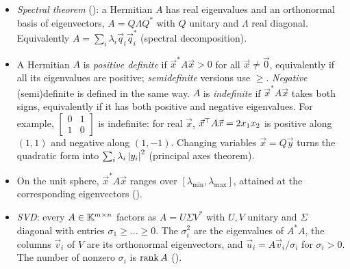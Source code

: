 \begin{itemize}
  \item \emph{Spectral theorem} (): a Hermitian $A$ has real eigenvalues and an orthonormal basis of eigenvectors, $A = Q\Lambda Q^\ast$ with $Q$ unitary and $\Lambda$ real diagonal. Equivalently $A = \sum_i \lambda_i\vec{q}_i\vec{q}_i^\ast$ (spectral decomposition).
  \item A Hermitian $A$ is \emph{positive definite} if $\vec{x}^\ast A\vec{x} > 0$ for all $\vec{x} \ne \vec{0}$, equivalently if all its eigenvalues are positive; \emph{semidefinite} versions use $\ge$. \emph{Negative} (semi)definite is defined in the same way. $A$ is \emph{indefinite} if $\vec{x}^\ast A\vec{x}$ takes both signs, equivalently if it has both positive and negative eigenvalues. For example, $\left[\begin{smallmatrix} 0 & 1 \\ 1 & 0 \end{smallmatrix}\right]$ is indefinite: for real $\vec{x}$, $\vec{x}^\top A\vec{x} = 2x_1x_2$ is positive along $(1, 1)$ and negative along $(1, -1)$. Changing variables $\vec{x} = Q\vec{y}$ turns the quadratic form into $\sum_i \lambda_i\left\lvert y_i \right\rvert^2$ (principal axes theorem).
  \item On the unit sphere, $\vec{x}^\ast A\vec{x}$ ranges over $[\lambda_{\min}, \lambda_{\max}]$, attained at the corresponding eigenvectors ().
  \item \emph{SVD}: every $A \in \mathbb{K}^{m \times n}$ factors as $A = U\Sigma V^\ast$ with $U, V$ unitary and $\Sigma$ diagonal with entries $\sigma_1 \ge \dots \ge 0$. The $\sigma_i^2$ are the eigenvalues of $A^\ast A$, the columns $\vec{v}_i$ of $V$ are its orthonormal eigenvectors, and $\vec{u}_i = A\vec{v}_i/\sigma_i$ for $\sigma_i > 0$. The number of nonzero $\sigma_i$ is $\operatorname{rank} A$ ().
\end{itemize}
